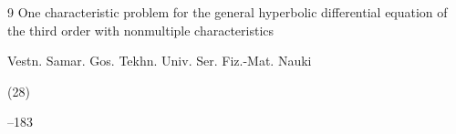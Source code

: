 \begin{thebibliography}{9}
\paper One characteristic problem for the general hyperbolic differential equation of the third order with nonmultiple characteristics

\jour Vestn. Samar. Gos. Tekhn. Univ. Ser. Fiz.-Mat. Nauki


(28)

--183
















\end{thebibliography}



\noindent

\hskip6.5cm \thedate \par\noindent

\hskip6.5cm\therevdate







%







\makeengtitlem







 \newpage

%



%

